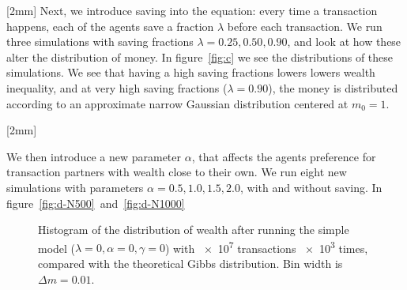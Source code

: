 \documentclass[12pt,a4paper]{article}
\newcommand\oppg[1]{\reversemarginnote{\textcolor{black!40}{#1)}}[2mm]}
\begin{document}
\oppg{c}
Next, we introduce saving into the equation: every time a transaction happens, each of the agents save a fraction $\lambda$ before each transaction. We run three simulations with saving fractions $\lambda = 0.25, 0.50, 0.90$, and look at how these alter the distribution of money. In figure~\ref{fig:c} we see the distributions of these simulations. We see that having a high saving fractions lowers lowers wealth inequality, and at very high saving fractions ($\lambda = 0.90$), the money is distributed according to an approximate narrow Gaussian distribution centered at $m_0 = 1$.

\oppg{d}

We then introduce a new parameter $\alpha$, that affects the agents preference for transaction partners with wealth close to their own. We run eight new simulations with parameters $\alpha = 0.5,1.0,1.5,2.0$, with and without saving. In figure~\ref{fig:d-N500}~and~\ref{fig:d-N1000}

\begin{figure}[!ht]
  \centering

  \caption{Histogram of the distribution of wealth after running the simple model ($\lambda = 0, \alpha = 0, \gamma = 0$) with \num{e7} transactions \num{e3} times, compared with the theoretical Gibbs distribution. Bin width is $\Delta{m} = 0.01$.} \label{fig:a}
\end{figure}
\end{document}
